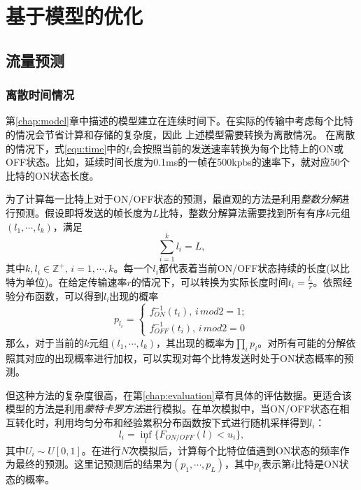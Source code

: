 
\chapter{基于模型的优化}
\label{chap:optimization}
\section{流量预测}
\subsection{离散时间情况}
第\ref{chap:model}章中描述的模型建立在连续时间下。在实际的传输中考虑每个比特的情况会节省计算和存储的复杂度，因此
上述模型需要转换为离散情况。
在离散的情况下，式\ref{equ:time}中的$t_i$会按照当前的发送速率转换为每个比特上的ON或OFF状态。比如，延续时间长度为0.1ms的一帧在500kpbs的速率下，就对应50个比特的ON状态长度。

为了计算每一比特上对于ON/OFF状态的预测，最直观的方法是利用\emph{整数分解}进行预测。假设即将发送的帧长度为$L$比特，整数分解算法需要找到所有有序$k$元组$(l_1, \cdots, l_k)$，满足
\begin{equation}
	\sum_{i = 1}^{k} l_i = L,
\end{equation}
其中$k,l_i \in \mathbb{Z}^+,\,i = 1,\cdots,k$。每一个$l_i$都代表着当前ON/OFF状态持续的长度(以比特为单位)。在给定传输速率$r$的情况下，可以转换为实际长度时间$t_i = \frac{l_i}{r}$。依照经验分布函数，可以得到$l_i$出现的概率
\begin{equation}
p_{l_i} = 
\begin{cases}
f_{ON}^{-1}(t_i), \,i\, mod 2 = 1;\\
f_{OFF}^{-1}(t_i), \,i\, mod 2 = 0
\end{cases}
\end{equation}
那么，对于当前的$k$元组$(l_1, \cdots, l_k)$，其出现的概率为$\prod_{i}p_i$。对所有可能的分解依照其对应的出现概率进行加权，可以实现对每个比特发送时处于ON状态概率的预测。

但这种方法的复杂度很高，在第\ref{chap:evaluation}章有具体的评估数据。更适合该模型的方法是利用\emph{蒙特卡罗方法}进行模拟。在单次模拟中，当ON/OFF状态在相互转化时，利用均匀分布和经验累积分布函数按下式进行随机采样得到$l_i$：
\begin{equation}
l_i = \inf_l\{F_{ON/OFF}(l) < u_i\},
\end{equation}
其中$U_i \sim U[0,1]$。在进行$N$次模拟后，计算每个比特位值遇到ON状态的频率作为最终的预测。这里记预测后的结果为$(p_1, \cdots, p_L)$，其中$p_i$表示第$i$比特是ON状态的概率。

